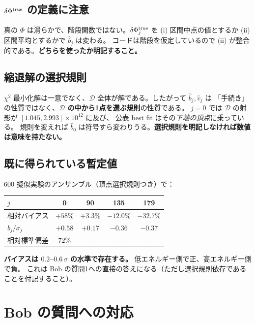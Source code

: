 \documentclass[11pt,a4paper]{ltjsarticle}
\newcommand{\dP}{\delta\Phi}
\begin{document}
\subsection*{$\dP^{\rm true}$ の定義に注意}
真の $\Phi$ は滑らかで、階段関数ではない。$\dP_j^{\rm true}$ を
(i) 区間中点の値とするか (ii) 区間平均とするかで $\hat b_j$ は変わる。
コードは階段を仮定しているので (ii) が整合的である。\textbf{どちらを使ったか明記すること。}

\subsection*{縮退解の選択規則}
$\chi^2$ 最小化解は一意でなく、$\mathcal{D}$ 全体が解である。したがって $\hat b_j,\hat v_j$ は
「手続き」の性質ではなく、\textbf{$\mathcal{D}$ の中から1点を選ぶ規則}の性質である。
$j=0$ では $\mathcal{D}$ の射影が $[1.045,2.993]\times10^{12}$ に及び、
公表 best fit はその\emph{下端の頂点}に乗っている。
規則を変えれば $\hat b_0$ は符号すら変わりうる。\textbf{選択規則を明記しなければ数値は意味を持たない。}

\subsection*{既に得られている暫定値}
600 擬似実験のアンサンブル（頂点選択規則つき）で：
\begin{center}\small
\begin{tabular}{lcccc}
\toprule
$j$ & 0 & 90 & 135 & 179 \\
\midrule
相対バイアス & $+58\%$ & $+3.3\%$ & $-12.0\%$ & $-32.7\%$ \\
$b_j/\sigma_j$ & $+0.58$ & $+0.17$ & $-0.36$ & $-0.37$ \\
相対標準偏差 & $72\%$ & --- & --- & --- \\
\bottomrule
\end{tabular}
\end{center}
\textbf{バイアスは $0.2$--$0.6\,\sigma$ の水準で存在する。} 低エネルギー側で正、高エネルギー側で負。
これは Bob の質問1への直接の答えになる（ただし選択規則依存であることを付記すること）。

\section{Bob の質問への対応}
\end{document}
